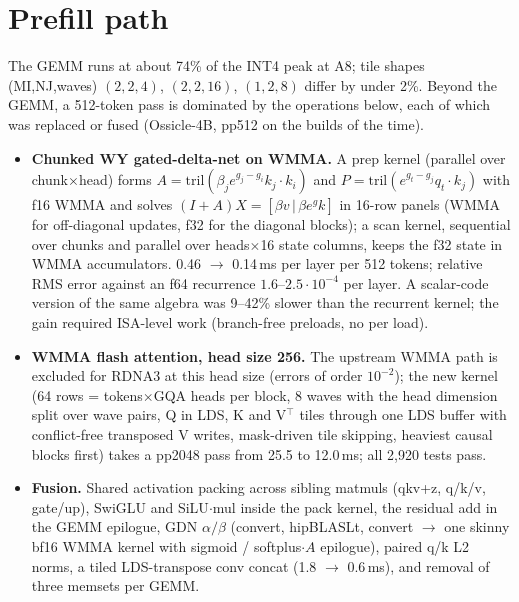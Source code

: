\documentclass[10.5pt,a4paper]{article}
\newcommand{\tx}[1]{\texttt{\detokenize{#1}}}
\begin{document}
\section{Prefill path}

The GEMM runs at about 74\% of the INT4 peak at A8; tile shapes (MI,NJ,waves) $(2,2,4)$, $(2,2,16)$, $(1,2,8)$ differ by under 2\%. Beyond the GEMM, a 512-token \tx{fast} pass is dominated by the operations below, each of which was
replaced or fused (Ossicle-4B, pp512 on the builds of the time).

\begin{itemize}
\item \textbf{Chunked WY gated-delta-net on WMMA.} A prep kernel (parallel over chunk$\times$head) forms $A=\mathrm{tril}(\beta_je^{g_j-g_i}k_j\!\cdot\!k_i)$ and $P=\mathrm{tril}(e^{g_t-g_j}q_t\!\cdot\!k_j)$ with f16 WMMA and solves
$(I+A)X=[\beta v\,|\,\beta e^{g}k]$ in 16-row panels (WMMA for off-diagonal updates, f32 for the diagonal blocks); a scan kernel, sequential over chunks and parallel over heads$\times$16 state columns, keeps the f32 state in WMMA
accumulators. 0.46 $\to$ 0.14\,ms per layer per 512 tokens; relative RMS error against an f64 recurrence $1.6$--$2.5\cdot10^{-4}$ per layer. A scalar-code version of the same algebra was 9--42\% slower than the recurrent kernel; the gain
required ISA-level work (branch-free preloads, no \tx{vmcnt(0)} per load).
\item \textbf{WMMA flash attention, head size 256.} The upstream WMMA path is excluded for RDNA3 at this head size (errors of order $10^{-2}$); the new kernel (64 rows = tokens$\times$GQA heads per block, 8 waves with the head dimension
split over wave pairs, Q in LDS, K and V$^{\top}$ tiles through one LDS buffer with conflict-free transposed V writes, mask-driven tile skipping, heaviest causal blocks first) takes a pp2048 pass from 25.5 to 12.0\,ms; all 2{,}920
\tx{FLASH_ATTN_EXT} tests pass.
\item \textbf{Fusion.} Shared activation packing across sibling matmuls (qkv+z, q/k/v, gate/up), SwiGLU and SiLU$\cdot$mul inside the pack kernel, the residual add in the GEMM epilogue, GDN $\alpha/\beta$ (convert, hipBLASLt, convert $\to$ one skinny bf16 WMMA
kernel with sigmoid / softplus$\cdot A$ epilogue), paired q/k L2 norms, a tiled LDS-transpose conv concat (1.8 $\to$ 0.6\,ms), and removal of three memsets per GEMM.
\end{itemize}
\end{document}
